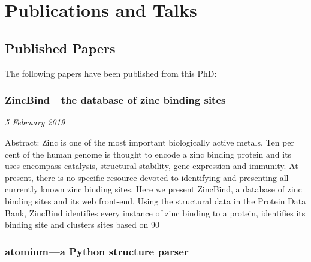 



\chapter{Publications and Talks} %



\section{Published Papers}

The following papers have been published from this PhD:

\subsection{ZincBind—the database of zinc binding sites}

\emph{5 February 2019}

Abstract: Zinc is one of the most important biologically active metals. Ten per cent of the human genome is thought to encode a zinc binding protein and its uses encompass catalysis, structural stability, gene expression and immunity. At present, there is no specific resource devoted to identifying and presenting all currently known zinc binding sites. Here we present ZincBind, a database of zinc binding sites and its web front-end. Using the structural data in the Protein Data Bank, ZincBind identifies every instance of zinc binding to a protein, identifies its binding site and clusters sites based on 90%


\subsection{atomium—a Python structure parser}

